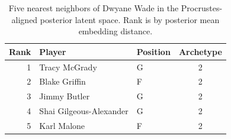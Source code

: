 \begin{table}[htbp]
  \centering\small
  \begin{tabular}{rllc}
    \toprule
    Rank & Player & Position & Archetype \\
    \midrule
    1 & Tracy McGrady & G & 2 \\
    2 & Blake Griffin & F & 2 \\
    3 & Jimmy Butler & G & 2 \\
    4 & Shai Gilgeous-Alexander & G & 2 \\
    5 & Karl Malone & F & 2 \\
    \bottomrule
  \end{tabular}
  \caption{Five nearest neighbors of Dwyane Wade in the Procrustes-aligned posterior latent space. Rank is by posterior mean embedding distance.}
\end{table}

